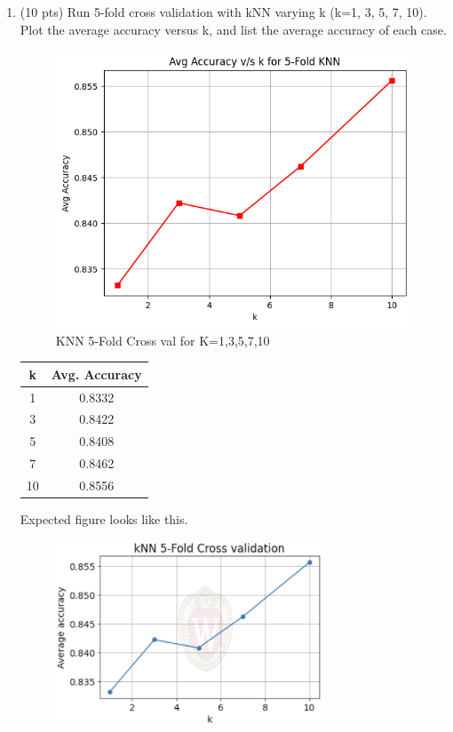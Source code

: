 \documentclass[a4paper]{article}
\theoremstyle{definition}
\newenvironment{soln}{
    \leavevmode\color{blue}\ignorespaces
}{}
\begin{document}
\begin{enumerate}
	\item (10 pts) Run 5-fold cross validation with kNN varying k (k=1, 3, 5, 7, 10). Plot the average accuracy versus k, and list the average accuracy of each case. \\
        \begin{soln}
            \begin{figure}[H]
    		\centering
    		\includegraphics[scale=0.5]{Images/KNN.png}
                \caption{KNN 5-Fold Cross val for K=1,3,5,7,10}
                \label{fig:knndb}
    	\end{figure}

            \begin{center}
                \begin{tabular}{c|c}
                    \hline
                    k & Avg. Accuracy \\
                    \hline
                       1 & 0.8332\\
                       3 & 0.8422\\
                       5 & 0.8408\\
                       7 & 0.8462\\
                       10 & 0.8556\\
                \end{tabular}
            \end{center}
        \end{soln}
 
	Expected figure looks like this.
	\begin{figure}[H]
		\centering
		\includegraphics[width=8cm]{Images/Original/knn.png}
	\end{figure}
	

\end{enumerate}
\end{document}

